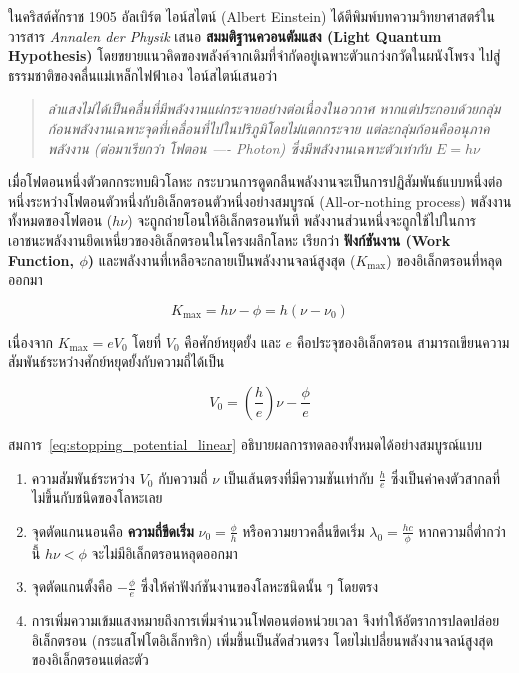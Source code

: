 ในคริสต์ศักราช 1905 อัลเบิร์ต ไอน์สไตน์ (Albert Einstein) ได้ตีพิมพ์บทความวิทยาศาสตร์ในวารสาร \textit{Annalen der Physik} เสนอ \textbf{สมมติฐานควอนตัมแสง (Light Quantum Hypothesis)} โดยขยายแนวคิดของพลังค์จากเดิมที่จำกัดอยู่เฉพาะตัวแกว่งกวัดในผนังโพรง ไปสู่ธรรมชาติของคลื่นแม่เหล็กไฟฟ้าเอง ไอน์สไตน์เสนอว่า

\begin{quote}
\textit{ลำแสงไม่ได้เป็นคลื่นที่มีพลังงานแผ่กระจายอย่างต่อเนื่องในอวกาศ หากแต่ประกอบด้วยกลุ่มก้อนพลังงานเฉพาะจุดที่เคลื่อนที่ไปในปริภูมิโดยไม่แตกกระจาย แต่ละกลุ่มก้อนคืออนุภาคพลังงาน (ต่อมาเรียกว่า โฟตอน ---- Photon) ซึ่งมีพลังงานเฉพาะตัวเท่ากับ $E = h\nu$}
\end{quote}

เมื่อโฟตอนหนึ่งตัวตกกระทบผิวโลหะ กระบวนการดูดกลืนพลังงานจะเป็นการปฏิสัมพันธ์แบบหนึ่งต่อหนึ่งระหว่างโฟตอนตัวหนึ่งกับอิเล็กตรอนตัวหนึ่งอย่างสมบูรณ์ (All-or-nothing process) พลังงานทั้งหมดของโฟตอน ($h\nu$) จะถูกถ่ายโอนให้อิเล็กตรอนทันที พลังงานส่วนหนึ่งจะถูกใช้ไปในการเอาชนะพลังงานยึดเหนี่ยวของอิเล็กตรอนในโครงผลึกโลหะ เรียกว่า \textbf{ฟังก์ชันงาน (Work Function, $\phi$)} และพลังงานที่เหลือจะกลายเป็นพลังงานจลน์สูงสุด ($K_{\max}$) ของอิเล็กตรอนที่หลุดออกมา

\begin{equation}
K_{\max} = h\nu - \phi = h(\nu - \nu_0)
\label{eq:einstein_photoelectric_full}
\end{equation}

เนื่องจาก $K_{\max} = e V_0$ โดยที่ $V_0$ คือศักย์หยุดยั้ง และ $e$ คือประจุของอิเล็กตรอน สามารถเขียนความสัมพันธ์ระหว่างศักย์หยุดยั้งกับความถี่ได้เป็น

\begin{equation}
V_0 = \left( \frac{h}{e} \right)\nu - \frac{\phi}{e}
\label{eq:stopping_potential_linear}
\end{equation}

สมการ~\eqref{eq:stopping_potential_linear} อธิบายผลการทดลองทั้งหมดได้อย่างสมบูรณ์แบบ
\begin{enumerate}
    \item ความสัมพันธ์ระหว่าง $V_0$ กับความถี่ $\nu$ เป็นเส้นตรงที่มีความชันเท่ากับ $\frac{h}{e}$ ซึ่งเป็นค่าคงตัวสากลที่ไม่ขึ้นกับชนิดของโลหะเลย
    \item จุดตัดแกนนอนคือ \textbf{ความถี่ขีดเริ่ม} $\nu_0 = \frac{\phi}{h}$ หรือความยาวคลื่นขีดเริ่ม $\lambda_0 = \frac{hc}{\phi}$ หากความถี่ต่ำกว่านี้ $h\nu < \phi$ จะไม่มีอิเล็กตรอนหลุดออกมา
    \item จุดตัดแกนตั้งคือ $-\frac{\phi}{e}$ ซึ่งให้ค่าฟังก์ชันงานของโลหะชนิดนั้น ๆ โดยตรง
    \item การเพิ่มความเข้มแสงหมายถึงการเพิ่มจำนวนโฟตอนต่อหน่วยเวลา จึงทำให้อัตราการปลดปล่อยอิเล็กตรอน (กระแสโฟโตอิเล็กทริก) เพิ่มขึ้นเป็นสัดส่วนตรง โดยไม่เปลี่ยนพลังงานจลน์สูงสุดของอิเล็กตรอนแต่ละตัว
\end{enumerate}

